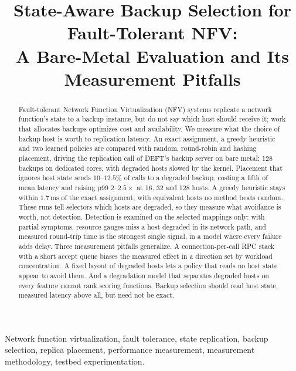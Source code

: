 \documentclass[journal]{IEEEtran}
\begin{document}
\title{State-Aware Backup Selection for Fault-Tolerant NFV:\\
A Bare-Metal Evaluation and Its Measurement Pitfalls}


\maketitle

\begin{abstract}
Fault-tolerant Network Function Virtualization (NFV) systems replicate a
network function's state to a backup instance, but do not say which host
should receive it; work that allocates backups optimizes cost and
availability. We measure what the choice of backup host is worth to
replication latency. An exact assignment, a greedy heuristic and two learned policies
are compared with random, round-robin and hashing placement, driving the
replication call of DEFT's backup server on bare metal: 128 backups on
dedicated cores, with degraded hosts slowed by the kernel. Placement that ignores host state sends
$10$--$12.5\%$ of calls to a degraded backup, costing a fifth of mean latency
and raising p99 $2$--$2.5\times$ at 16, 32 and 128 hosts. A greedy heuristic
stays within $1.7$\,ms of the exact assignment; with equivalent hosts no
method beats random. These runs tell selectors which hosts are degraded, so
they measure what avoidance is worth, not detection. Detection is examined on
the selected mappings only: with partial symptoms,
resource gauges miss a host degraded in its network path, and measured
round-trip time is the strongest single signal, in a model where every failure
adds delay. Three measurement pitfalls
generalize. A connection-per-call RPC stack with a short accept queue biases
the measured effect in a direction set by workload concentration. A fixed layout
of degraded hosts lets a policy that reads no host state appear to avoid them.
And a degradation model that separates degraded hosts on every feature cannot
rank scoring functions. Backup selection should read host state, measured
latency above all, but need not be exact.
\end{abstract}

\begin{IEEEkeywords}
Network function virtualization, fault tolerance, state replication, backup
selection, replica placement, performance measurement, measurement methodology,
testbed experimentation.
\end{IEEEkeywords}
\end{document}
